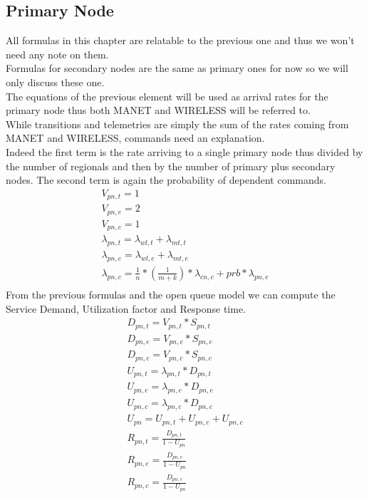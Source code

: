 \documentclass[11pt]{article}
\begin{document}
\subsection{Primary Node}
All formulas in this chapter are relatable to the previous one and thus we won't need any note on them.\\
Formulas for secondary nodes are the same as primary ones for now so we will only discuss these one.\\
The equations of the previous element will be used as arrival rates for the primary node thus both MANET and WIRELESS will be referred to.\\
While transitions and telemetries are simply the sum of the rates coming from MANET and WIRELESS, commands need an explanation.\\
Indeed the first term is the rate arriving to a single primary node thus divided by the number of regionals and then by the number of primary plus secondary nodes. The second term is again the probability of dependent commands.
\begin{equation}
    \begin{array}{l}
        V_{pn, t} = 1 \\
        V_{pn, e} = 2 \\ %
        V_{pn,c} = 1 \\
        \lambda_{pn, t} = \lambda_{wl, t} + \lambda_{mt, t} \\
        \lambda_{pn, e} = \lambda_{wl, e} + \lambda_{mt, e} \\
        \lambda_{pn, c} = \frac{1}{n} * (\frac{1}{m+k}) * \lambda_{cn, c} + prb * \lambda_{pn, e}  \\\
    \end{array}
\end{equation}
From the previous formulas and the open queue model we can compute the Service Demand, Utilization factor and Response time.
\begin{equation}
    \begin{array}{l}
        D_{pn, t} = V_{pn, t} * S_{pn, t} \\
        D_{pn, e} = V_{pn, e} * S_{pn, e} \\
        D_{pn, c} = V_{pn, c} * S_{pn, c} \\
        U_{pn, t} = \lambda_{pn, t} * D_{pn, t} \\
        U_{pn, e} = \lambda_{pn, e} * D_{pn, e} \\
        U_{pn, c} = \lambda_{pn, c} * D_{pn, c} \\
        U_{pn} = U_{pn, t} + U_{pn, e} + U_{pn, c} \\
        R_{pn, t} = \frac{D_{pn, t}}{1 - U_{pn}} \\
        R_{pn, e} = \frac{D_{pn, e}}{1 - U_{pn}} \\
        R_{pn, c} = \frac{D_{pn, c}}{1 - U_{pn}} \\
    \end{array}
\end{equation}
\end{document}
